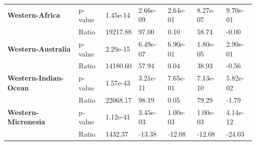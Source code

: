 \begin{table}[H]
{\begin{tabular}{lllllll}
            \textbf{Western-Africa}                             & p-value  &
            1.45e-14                                            & 2.66e-09 &
            2.64e-01                                            & 8.27e-07 &
            9.70e-01
            \\
            \textbf{}                                           & Ratio    &
            19217.88                                            & 97.00    &
            0.10
                                                                & 58.74    &
            -0.00
            \\
            \textbf{Western-Australia}                          & p-value  &
            2.29e-15                                            & 6.49e-07 &
            6.90e-01                                            & 1.80e-05 &
            2.90e-01
            \\
            \textbf{}                                           & Ratio    &
            14180.60                                            & 57.94    &
            0.04
                                                                & 38.93    &
            -0.56
            \\
            \textbf{Western-Indian-Ocean}                       & p-value  &
            1.57e-43                                            & 3.21e-11 &
            7.65e-01                                            & 7.13e-10 &
            5.82e-02
            \\
            \textbf{}                                           & Ratio    &
            22068.17                                            & 98.19    &
            0.05
                                                                & 79.29    &
            -1.79
            \\
            \textbf{Western-Micronesia}                         & p-value  &
            1.12e-41                                            & 3.45e-03 &
            1.00e-03                                            & 1.00e-03 &
            4.14e-12
            \\
            \textbf{}                                           & Ratio    &
            1432.37                                             & -13.38   &
            -12.08
                                                                & -12.08   &
            -24.03
            \\ \hline
        \end{tabular}%
    }
\end{table}

